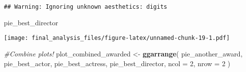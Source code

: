 \documentclass[]{article}
\newenvironment{Shaded}{\begin{snugshade}}{\end{snugshade}}
\newcommand{\CommentTok}[1]{\textcolor[rgb]{0.56,0.35,0.01}{\textit{#1}}}
\newcommand{\DataTypeTok}[1]{\textcolor[rgb]{0.13,0.29,0.53}{#1}}
\newcommand{\DecValTok}[1]{\textcolor[rgb]{0.00,0.00,0.81}{#1}}
\newcommand{\KeywordTok}[1]{\textcolor[rgb]{0.13,0.29,0.53}{\textbf{#1}}}
\newcommand{\NormalTok}[1]{#1}
\newcommand{\StringTok}[1]{\textcolor[rgb]{0.31,0.60,0.02}{#1}}
\begin{document}
\begin{verbatim}
## Warning: Ignoring unknown aesthetics: digits
\end{verbatim}

\begin{Shaded}
\begin{Highlighting}[]
\NormalTok{ pie_best_director}
\end{Highlighting}
\end{Shaded}

\texttt{[image: final\_analysis\_files/figure-latex/unnamed-chunk-19-1.pdf]}

\begin{Shaded}
\begin{Highlighting}[]
 \CommentTok{#Combine plots!}
\NormalTok{ plot_combined_awarded <-}
\StringTok{   }\KeywordTok{ggarrange}\NormalTok{(}
\NormalTok{     pie_another_award,}
\NormalTok{     pie_best_actor,}
\NormalTok{    pie_best_actress,}
\NormalTok{    pie_best_director,}
    \DataTypeTok{ncol =} \DecValTok{2}\NormalTok{,}
    \DataTypeTok{nrow =} \DecValTok{2}
\NormalTok{  )}



\end{Highlighting}
\end{Shaded}
\end{document}
